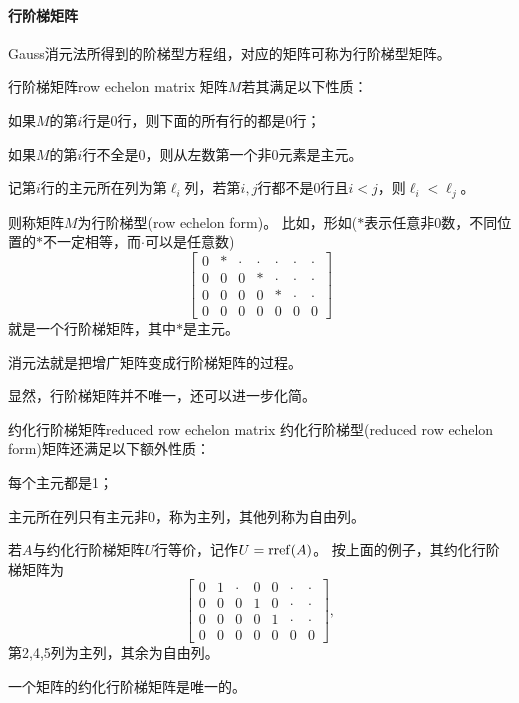 \paragraph{行阶梯矩阵}

Gauss消元法所得到的阶梯型方程组，对应的矩阵可称为行阶梯型矩阵。

\begin{definition}{行阶梯矩阵}{row echelon matrix}
	矩阵$M$若其满足以下性质：
	\begin{compactitem}
		\item 如果$M$的第$i$行是0行，则下面的所有行的都是0行；
		\item 如果$M$的第$i$行不全是0，则从左数第一个非0元素是主元。
		\item 记第$i$行的主元所在列为第$\ell_i$列，若第$i,j$行都不是0行且$i < j$，则$\ell_i < \ell_j$。
	\end{compactitem}
	则称矩阵$M$为行阶梯型(row echelon form)。
	\tcblower
	比如，形如($\ast$表示任意非0数，不同位置的$\ast$不一定相等，而$\cdot$可以是任意数)
	\[
		\begin{bmatrix}
			0&\ast&\cdot&\cdot&\cdot&\cdot&\cdot\\
			0&0&0&\ast&\cdot&\cdot&\cdot\\
			0&0&0&0&\ast&\cdot&\cdot\\
			0&0&0&0&0&0&0
		\end{bmatrix}
	\]
	就是一个行阶梯矩阵，其中$\ast$是主元。
\end{definition}
\begin{remark}
	消元法就是把增广矩阵变成行阶梯矩阵的过程。
\end{remark}

显然，行阶梯矩阵并不唯一，还可以进一步化简。

\begin{definition}{约化行阶梯矩阵}{reduced row echelon matrix}
	约化行阶梯型(reduced row echelon form)矩阵还满足以下额外性质：
	\begin{compactitem}
		\item 每个主元都是1；
		\item 主元所在列只有主元非0，称为主列，其他列称为自由列。
	\end{compactitem}
	若$A$与约化行阶梯矩阵$U$行等价，记作$U = \operatorname{rref}(A)$。
	\tcblower
	按上面的例子，其约化行阶梯矩阵为
	\[
		\begin{bmatrix}
			0&1&\cdot&0&0&\cdot&\cdot\\
			0&0&0&1&0&\cdot&\cdot\\
			0&0&0&0&1&\cdot&\cdot\\
			0&0&0&0&0&0&0
		\end{bmatrix},
	\]
	第2,4,5列为主列，其余为自由列。
\end{definition}
\begin{theorem}
	{}{}
	一个矩阵的约化行阶梯矩阵是唯一的。
\end{theorem}

